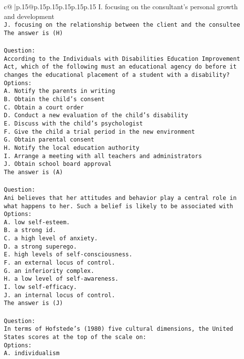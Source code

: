 \documentclass{article}
\begin{document}
{\begin{supertabular}{c@{$\;$}|p{.15\linewidth}@{}p{.15\linewidth}p{.15\linewidth}p{.15\linewidth}p{.15\linewidth}p{.15\linewidth}}
{{{I. focusing on the consultant's personal growth and development\\ \tt J. focusing on the relationship between the client and the consultee\\ \tt The answer is (H)\\ \tt \\ \tt Question:\\ \tt According to the Individuals with Disabilities Education Improvement Act, which of the following must an educational agency do before it changes the educational placement of a student with a disability?\\ \tt Options:\\ \tt A. Notify the parents in writing\\ \tt B. Obtain the child's consent\\ \tt C. Obtain a court order\\ \tt D. Conduct a new evaluation of the child's disability\\ \tt E. Discuss with the child's psychologist\\ \tt F. Give the child a trial period in the new environment\\ \tt G. Obtain parental consent\\ \tt H. Notify the local education authority\\ \tt I. Arrange a meeting with all teachers and administrators\\ \tt J. Obtain school board approval\\ \tt The answer is (A)\\ \tt \\ \tt Question:\\ \tt Ani believes that her attitudes and behavior play a central role in what happens to her. Such a belief is likely to be associated with\\ \tt Options:\\ \tt A. low self-esteem.\\ \tt B. a strong id.\\ \tt C. a high level of anxiety.\\ \tt D. a strong superego.\\ \tt E. high levels of self-consciousness.\\ \tt F. an external locus of control.\\ \tt G. an inferiority complex.\\ \tt H. a low level of self-awareness.\\ \tt I. low self-efficacy.\\ \tt J. an internal locus of control.\\ \tt The answer is (J)\\ \tt \\ \tt Question:\\ \tt In terms of Hofstede’s (1980) five cultural dimensions, the United States scores at the top of the scale on:\\ \tt Options:\\ \tt A. individualism }}}
\end{supertabular}}
\end{document}
